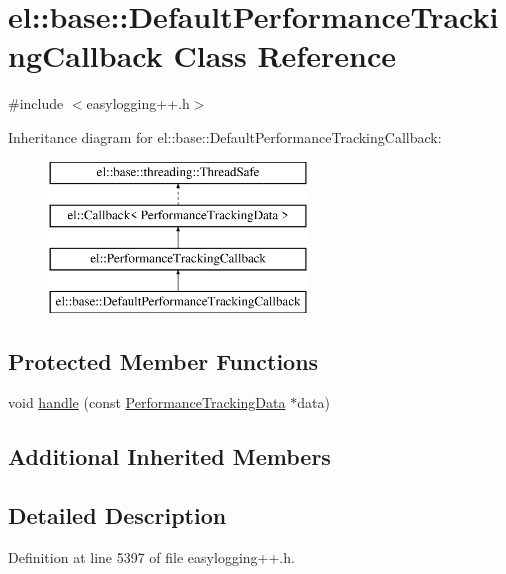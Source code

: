 \hypertarget{classel_1_1base_1_1_default_performance_tracking_callback}{}\section{el\+:\+:base\+:\+:Default\+Performance\+Tracking\+Callback Class Reference}
\label{classel_1_1base_1_1_default_performance_tracking_callback}


{\ttfamily \#include $<$easylogging++.\+h$>$}

Inheritance diagram for el\+:\+:base\+:\+:Default\+Performance\+Tracking\+Callback\+:\begin{figure}[H]
\begin{center}
\leavevmode
\includegraphics[height=4.000000cm]{classel_1_1base_1_1_default_performance_tracking_callback}
\end{center}
\end{figure}
\subsection*{Protected Member Functions}
\begin{DoxyCompactItemize}
\item 
void \hyperlink{classel_1_1base_1_1_default_performance_tracking_callback_afabb8820e1bd9a7fb89508fe11f59d37}{handle} (const \hyperlink{classel_1_1_performance_tracking_data}{Performance\+Tracking\+Data} $\ast$data)
\end{DoxyCompactItemize}
\subsection*{Additional Inherited Members}


\subsection{Detailed Description}


Definition at line 5397 of file easylogging++.\+h.



